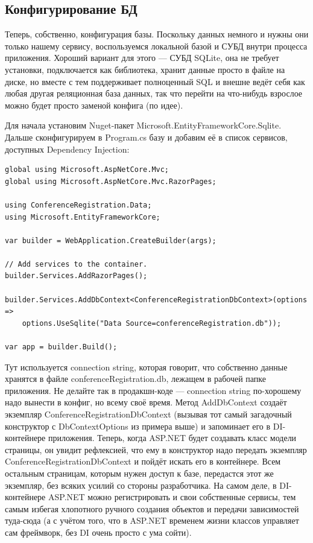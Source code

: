\documentclass[a5paper]{article}
\begin{document}
\subsection{Конфигурирование БД}

Теперь, собственно, конфигурация базы. Поскольку данных немного и нужны они только нашему сервису, воспользуемся локальной базой и СУБД внутри процесса приложения. Хороший вариант для этого --- СУБД SQLite, она не требует установки, подключается как библиотека, хранит данные просто в файле на диске, но вместе с тем поддерживает полноценный SQL и внешне ведёт себя как любая другая реляционная база данных, так что перейти на что-нибудь взрослое можно будет просто заменой конфига (по идее).

Для начала установим Nuget-пакет Microsoft.EntityFrameworkCore.Sqlite. Дальше сконфигурируем в Program.cs базу и добавим её в список сервисов, доступных Dependency Injection:

\begin{verbatim}
global using Microsoft.AspNetCore.Mvc;
global using Microsoft.AspNetCore.Mvc.RazorPages;

using ConferenceRegistration.Data;
using Microsoft.EntityFrameworkCore;

var builder = WebApplication.CreateBuilder(args);

// Add services to the container.
builder.Services.AddRazorPages();

builder.Services.AddDbContext<ConferenceRegistrationDbContext>(options =>
    options.UseSqlite("Data Source=conferenceRegistration.db"));

var app = builder.Build();
\end{verbatim}

Тут используется connection string, которая говорит, что собственно данные хранятся в файле conferenceRegistration.db, лежащем в рабочей папке приложения. Не делайте так в продакшн-коде --- connection string по-хорошему надо вынести в конфиг, но всему своё время. Метод AddDbContext создаёт экземпляр ConferenceRegistrationDbContext (вызывая тот самый загадочный конструктор с DbContextOptions из примера выше) и запоминает его в DI-контейнере приложения. Теперь, когда ASP.NET будет создавать класс модели страницы, он увидит рефлексией, что ему в конструктор надо передать экземпляр ConferenceRegistrationDbContext и пойдёт искать его в контейнере. Всем остальным страницам, которым нужен доступ к базе, передастся этот же экземпляр, без всяких усилий со стороны разработчика. На самом деле, в DI-контейнере ASP.NET можно регистрировать и свои собственные сервисы, тем самым избегая хлопотного ручного создания объектов и передачи зависимостей туда-сюда (а с учётом того, что в ASP.NET временем жизни классов управляет сам фреймворк, без DI очень просто с ума сойти).
\end{document}
